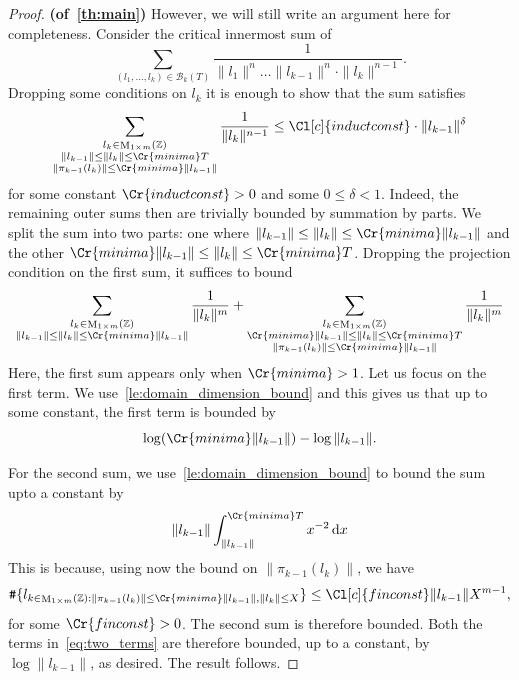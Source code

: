 \documentclass{amsart}
\theoremstyle{definition}
\theoremstyle{remark}
\newcommand{\diff}{\,\mathrm{d}}
\DeclareMathOperator{\M}{M}
\DeclareMathOperator{\card}{\texttt{\#}}
\begin{document}
\begin{proof} {\bf (of~\cref{th:main})}
However, we will still write an argument here for completeness. Consider the critical innermost sum of
\begin{equation}
\sum_{(l_{1},\dots,l_{k}) \in \mathcal{B}_{k}(T)}^{} \frac{1}{\|l_{1}\|^{n} \dots \|l_{k-1}\|^{n}\cdot\|l_{k}\|^{n-1}}.
\end{equation}
Dropping some conditions on $l_{k}$ it is enough to show that the sum satisfies
\begin{equation}
\sum_{ \substack{l_{k} \in \M_{1 \times m}(\mathbb{Z}) \\ \|l_{k-1}\| \leq \|l_{k}\| \leq \Cr{minima} T  \\ \|\pi_{k-1}(l_{k})\| \leq \Cr{minima} \|l_{k-1}\| }  }^{} \frac{1}{ \|l_{k}\|^{n-1}}\leq \Cl[c]{inductconst}\cdot \|l_{k-1}\|^\delta 
\end{equation}
for some constant $\Cr{inductconst}>0$ and some $0\leq \delta<1$. Indeed, the remaining outer sums then are trivially bounded by summation by parts. 
We split the sum into two parts: one where $ \|l_{k-1}\|\leq \|l_{k}\| \leq \Cr{minima} \|l_{k-1}\|$ and the other $\Cr{minima}\|l_{k-1}\| \leq \|l_{k}\|\leq \Cr{minima} T$. 
Dropping the projection condition on the first sum, it suffices to bound
\begin{equation}
\sum_{ \substack{l_{k} \in \M_{1 \times m}(\mathbb{Z}) \\  \|l_{k-1}\|\leq \|l_{k}\| \leq \Cr{minima} \|l_{k-1}\|  }  }^{} \frac{1}{ \|l_{k}\|^{m}}
+ 
\sum_{ \substack{l_{k} \in \M_{1 \times m}(\mathbb{Z}) \\ \Cr{minima}\|l_{k-1}\| \leq \|l_{k}\| \leq \Cr{minima} T  \\ \|\pi_{k-1}(l_{k})\| \leq \Cr{minima} \|l_{k-1}\| }  }^{} \frac{1}{ \|l_{k}\|^{m}}
\label{eq:two_terms}
\end{equation}
Here, the first sum appears only when $\Cr{minima} > 1$.
Let us focus on the first term. We use~\cref{le:domain_dimension_bound} and 
this gives us that up to some constant, the first term is bounded by 
\begin{equation}
    \log (\Cr{minima} \|l_{k-1}\| )- \log \|l_{k-1}\| .
\end{equation}

For the second sum, we use~\cref{le:domain_dimension_bound} to bound the sum upto a constant by
\begin{equation}
    \|l_{k-1}\| \int_{\|l_{k-1}\|}^{ \Cr{minima} T }  x^{-2} \diff x
\end{equation}
This is because, using now the bound on $\|\pi_{k-1}(l_{k})\|$, we have
\begin{equation}
    \card \{ l_{k
 \in\M_{1 \times m}(\mathbb{Z}) : \|\pi_{k-1}(l_{k})\| \leq \Cr{minima} \|l_{k-1}\| , \|l_{k}\| \leq X
}\} \leq \Cl[c]{finconst} \|l_{k-1}\| X^{m-1},
\end{equation}
for some $\Cr{finconst}>0$. The second sum is therefore bounded. 
Both the terms in~\cref{eq:two_terms} are therefore bounded, up to a constant, by $\log \|l_{k-1}\|$, as desired. The result follows.
\end{proof}
\end{document}
